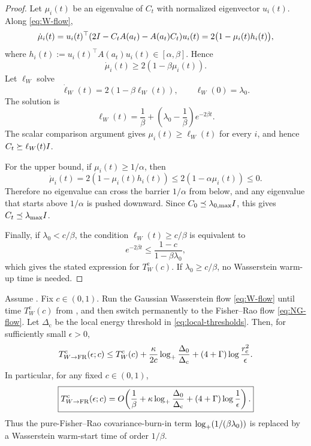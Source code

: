 \begin{proof}
Let $\mu_i(t)$ be an eigenvalue of $C_t$ with normalized eigenvector $u_i(t)$. Along
\eqref{eq:W-flow},
\[
    \dot\mu_i(t)
    =u_i(t)^\top(2I-C_tA(a_t)-A(a_t)C_t)u_i(t)
    =2\bigl(1-\mu_i(t)h_i(t)\bigr),
\]
where $h_i(t):=u_i(t)^\top A(a_t)u_i(t)\in[\alpha,\beta]$. Hence
\[
    \dot\mu_i(t)\ge 2(1-\beta\mu_i(t)).
\]
Let $\ell_W$ solve
\[
    \dot\ell_W(t)=2(1-\beta\ell_W(t)),
    \qquad
    \ell_W(0)=\lambda_0.
\]
The solution is
\[
    \ell_W(t)=\frac1\beta+\left(\lambda_0-\frac1\beta\right)e^{-2\beta t}.
\]
The scalar comparison argument gives $\mu_i(t)\ge\ell_W(t)$ for every $i$, and hence
$C_t\succeq\ell_W(t)I$.

For the upper bound, if $\mu_i(t)\ge1/\alpha$, then
\[
    \dot\mu_i(t)=2(1-\mu_i(t)h_i(t))\le 2(1-\alpha\mu_i(t))\le0.
\]
Therefore no eigenvalue can cross the barrier $1/\alpha$ from below, and any eigenvalue that
starts above $1/\alpha$ is pushed downward. Since $C_0\preceq\lambda_{0,\max}I$, this gives
$C_t\preceq\lambda_{\max}I$.

Finally, if $\lambda_0<c/\beta$, the condition $\ell_W(t)\ge c/\beta$ is equivalent to
\[
    e^{-2\beta t}\le \frac{1-c}{1-\beta\lambda_0},
\]
which gives the stated expression for $T_W^{\mathrm c}(c)$. If $\lambda_0\ge c/\beta$, no
Wasserstein warm-up time is needed.
\end{proof}

\begin{theorem}
\label{thm:cont-W-to-FR}
Assume . Fix $c\in(0,1)$. Run the
Gaussian Wasserstein flow \eqref{eq:W-flow} until time $T_W^{\mathrm c}(c)$ from
, and then switch permanently to the Fisher--Rao flow
\eqref{eq:NG-flow}. Let $\Delta_{\mathrm c}$ be the local energy threshold in
\eqref{eq:local-thresholds}. Then, for sufficiently small $\epsilon>0$,
\[
    T_{W\to\mathrm{FR}}^{\mathrm c}(\epsilon;c)
    \le
    T_W^{\mathrm c}(c)
    +\frac{\kappa}{2c}\log_+\frac{\Delta_0}{\Delta_{\mathrm c}}
    +(4+\Gamma)\log\frac{r_{\mathrm c}^2}{\epsilon}.
\]
In particular, for any fixed $c\in(0,1)$,
\[
    \boxed{
    T_{W\to\mathrm{FR}}^{\mathrm c}(\epsilon;c)
    =
    O\!\left(
        \frac1\beta
        +\kappa\log_+\frac{\Delta_0}{\Delta_{\mathrm c}}
        +(4+\Gamma)\log\frac1\epsilon
    \right).
    }
\]
Thus the pure-Fisher--Rao covariance-burn-in term
$\log_+(1/(\beta\lambda_0))$ is replaced by a Wasserstein warm-start time of order $1/\beta$.
\end{theorem}

